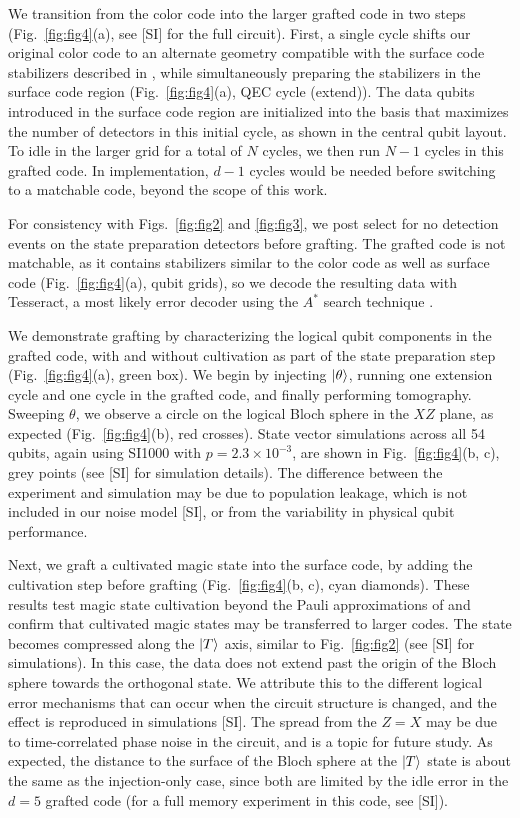 \documentclass[%
 reprint,
 amsmath,amssymb,
 aps,
]{revtex4-2}
\begin{document}
We transition from the color code into the larger grafted code in two steps (Fig.~\ref{fig:fig4}(a), see [SI] for the full circuit). First, a single cycle shifts our original color code to an alternate geometry compatible with the surface code stabilizers described in \cite{gidney_magic_2024}, while simultaneously preparing the stabilizers in the surface code region (Fig.~\ref{fig:fig4}(a), QEC cycle (extend)). The data qubits introduced in the surface code region are initialized into the basis that maximizes the number of detectors in this initial cycle, as shown in the central qubit layout. To idle in the larger grid for a total of $N$ cycles, we then run $N-1$ cycles in this grafted code. In implementation, $d-1$ cycles would be needed before switching to a matchable code, beyond the scope of this work.

For consistency with Figs.~\ref{fig:fig2} and \ref{fig:fig3}, we post select for no detection events on the state preparation detectors before grafting. The grafted code is not matchable, as it contains stabilizers similar to the color code as well as surface code (Fig.~\ref{fig:fig4}(a), qubit grids), so we decode the resulting data with Tesseract, a most likely error decoder using the $A^*$ search technique \cite{beni_tesseract_2025}. 

We demonstrate grafting by characterizing the logical qubit components in the grafted code, with and without cultivation as part of the state preparation step (Fig.~\ref{fig:fig4}(a), green box). We begin by injecting $\ket{\theta}$, running one extension cycle and one cycle in the grafted code, and finally performing tomography. Sweeping $\theta$, we observe a circle on the logical Bloch sphere in the $XZ$ plane, as expected (Fig.~\ref{fig:fig4}(b), red crosses). State vector simulations across all 54 qubits, again using SI1000 \cite{gidney_fault-tolerant_2021} with $p = 2.3 \times 10^{-3}$, are shown in Fig.~\ref{fig:fig4}(b, c), grey points (see [SI] for simulation details). The difference between the experiment and simulation may be due to population leakage, which is not included in our noise model [SI], or from the variability in physical qubit performance. 

Next, we graft a cultivated magic state into the surface code, by adding the cultivation step before grafting (Fig.~\ref{fig:fig4}(b, c), cyan diamonds). These results test magic state cultivation beyond the Pauli approximations of \cite{gidney_magic_2024} and confirm that cultivated magic states may be transferred to larger codes. The state becomes compressed along the $\ket{T}$ axis, similar to Fig.~\ref{fig:fig2} (see [SI] for simulations). In this case, the data does not extend past the origin of the Bloch sphere towards the orthogonal state. We attribute this to the different logical error mechanisms that can occur when the circuit structure is changed, and the effect is reproduced in simulations [SI]. The spread from the $Z=X$ may be due to time-correlated phase noise in the circuit, and is a topic for future study.
As expected, the distance to the surface of the Bloch sphere at the $\ket{T}$ state is about the same as the injection-only case, since both are limited by the idle error in the $d=5$ grafted code (for a full memory experiment in this code, see [SI]).
 
\end{document}
